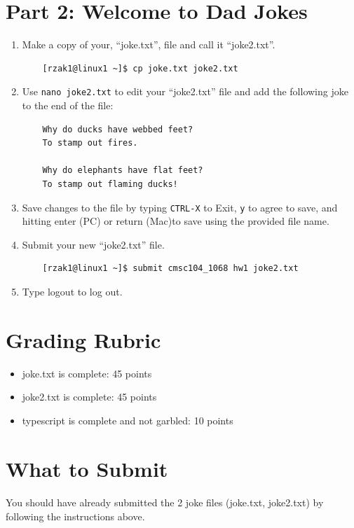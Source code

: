 \documentclass[letter,11pt]{article}
\begin{document}
\section*{Part 2: Welcome to Dad Jokes}
\begin{enumerate}
    \item Make a copy of your, ``joke.txt'', file and call it ``joke2.txt''.
    \begin{verbatim}
    [rzak1@linux1 ~]$ cp joke.txt joke2.txt
    \end{verbatim}
    \item Use \texttt{nano joke2.txt} to edit your ``joke2.txt'' file and add the following joke to the end of the file:
    \begin{verbatim}
    Why do ducks have webbed feet?
    To stamp out fires.

    Why do elephants have flat feet?
    To stamp out flaming ducks!
    \end{verbatim}
    \item Save changes to the file by typing \texttt{CTRL-X} to Exit, \texttt{y} to agree to save, and hitting enter (PC) or return (Mac)to save using the provided file name.
    \item Submit your new ``joke2.txt'' file.
    \begin{verbatim}
    [rzak1@linux1 ~]$ submit cmsc104_1068 hw1 joke2.txt
    \end{verbatim}
    \item Type logout to log out.
\end{enumerate}

\section*{Grading Rubric}
\begin{itemize}
    \item joke.txt is complete: 45 points
    \item joke2.txt is complete: 45 points
    \item typescript is complete and not garbled: 10 points
\end{itemize}

\section*{What to Submit}
\paragraph{}You should have already submitted the 2 joke files (joke.txt, joke2.txt) by following the instructions above.
\end{document}
